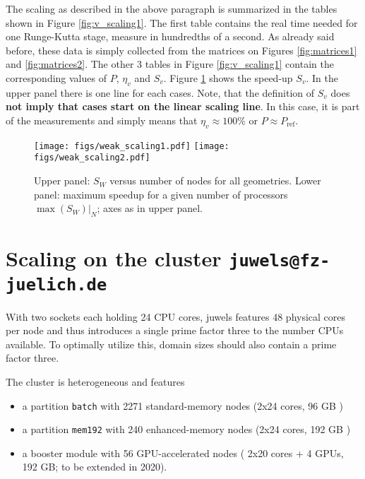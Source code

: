 The scaling as described in the above paragraph is summarized in the tables
shown in Figure \ref{fig:v_scaling1}. The first table contains the real time
needed for one Runge-Kutta stage, measure in hundredths of a second. As already
said before, these data is simply collected from the matrices on
Figures \ref{fig:matrices1} and \ref{fig:matrices2}. The other 3 tables in
Figure \ref{fig:v_scaling1} contain the corresponding values of $P$, $\eta_v$
and $S_v$.  Figure \ref{fig:v_scaling2} shows the speed-up $S_v$. In the upper
panel there is one line for each cases.  Note, that the definition of $S_v$
does \textbf{not imply that cases start on the linear scaling line}. In this
case, it is part of the measurements and simply means that $\eta_v\approx 100\%$
or $P\approx P_\mathrm{ref}$.

\begin{figure}
  \begin{centering}
  \texttt{[image: figs/weak\_scaling1.pdf]}%
  \texttt{[image: figs/weak\_scaling2.pdf]}\\
  \end{centering}
  \caption{Upper panel: $S_W$ versus number of nodes for all geometries. Lower
    panel: maximum speedup for a given number of processors $\max(S_W)|_N$; axes
    as in upper panel.  }
  \label{fig:v_scaling2}
\end{figure}


\section{Scaling on the cluster \texttt{juwels@fz-juelich.de}}

With two sockets each holding 24 CPU cores, juwels features 48 physical cores per node and thus
introduces a single prime factor three to the number CPUs available. To optimally utilize this,
domain sizes should also contain a prime factor three.

The cluster is heterogeneous and features
\begin{itemize}
  \item[(1)] a partition \texttt{batch} with 2271 standard-memory nodes (2x24 cores, 96 GB )
  \item[(2)] a partition \texttt{mem192} with 240 enhanced-memory nodes (2x24 cores, 192 GB )
  \item[(3)] a booster module with 56 GPU-accelerated nodes ( 2x20 cores + 4 GPUs, 192 GB; to be extended in 2020).
\end{itemize}

